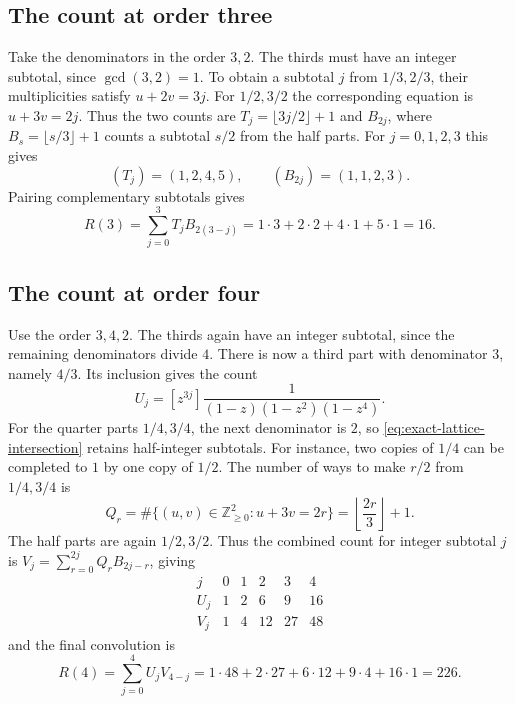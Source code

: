 \subsection{The count at order three}
Take the denominators in the order \(3,2\). The thirds must have an
integer subtotal, since \(\gcd(3,2)=1\). To obtain a subtotal \(j\)
from \(1/3,2/3\), their multiplicities satisfy \(u+2v=3j\). For
\(1/2,3/2\) the corresponding equation is \(u+3v=2j\). Thus the two
counts are \(T_j=\lfloor3j/2\rfloor+1\) and
\(B_{2j}\), where \(B_s=\lfloor s/3\rfloor+1\) counts a subtotal
\(s/2\) from the half parts. For \(j=0,1,2,3\) this gives
\[
 (T_j)=(1,2,4,5),\qquad (B_{2j})=(1,1,2,3).
\]
Pairing complementary subtotals gives
\[
 R(3)=\sum_{j=0}^{3}T_jB_{2(3-j)}
     =1\cdot3+2\cdot2+4\cdot1+5\cdot1=16.
\]

\subsection{The count at order four}
Use the order \(3,4,2\). The thirds again have an integer subtotal,
since the remaining denominators divide \(4\). There is now a third
part with denominator \(3\), namely \(4/3\). Its inclusion gives the
count
\[
 U_j=[z^{3j}]\frac{1}{(1-z)(1-z^2)(1-z^4)}.
\]
For the quarter parts \(1/4,3/4\), the next denominator is \(2\),
so \eqref{eq:exact-lattice-intersection} retains half-integer
subtotals. For instance, two copies of \(1/4\) can be completed to
\(1\) by one copy of \(1/2\). The number of ways to make \(r/2\)
from \(1/4,3/4\) is
\[
 Q_r=\#\{(u,v)\in\mathbb Z_{\ge0}^2:u+3v=2r\}
     =\left\lfloor\frac{2r}{3}\right\rfloor+1.
\]
The half parts are again \(1/2,3/2\). Thus the combined count for
integer subtotal \(j\) is \(V_j=\sum_{r=0}^{2j}Q_r B_{2j-r}\), giving
\[
 \begin{array}{c|rrrrr}
 j   &0&1&2&3&4\\ \hline
 U_j &1&2&6&9&16\\
 V_j &1&4&12&27&48
 \end{array}
\]
and the final convolution is
\[
 R(4)=\sum_{j=0}^{4}U_jV_{4-j}
     =1\cdot48+2\cdot27+6\cdot12+9\cdot4+16\cdot1=226.
\]
